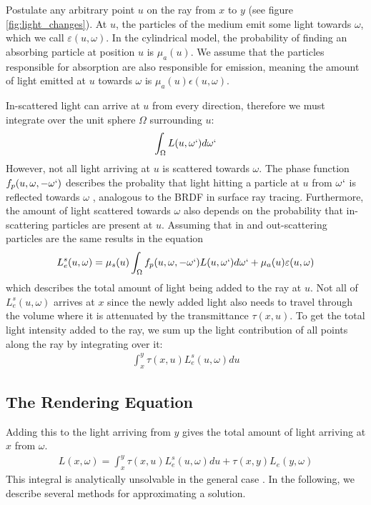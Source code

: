 Postulate any arbitrary point ${u}$ on the ray from ${x}$ to ${y}$ (see figure \ref{fig:light_changes}).
At ${u}$, the particles of the medium emit some light towards $\omega$\cite{468400}, which we call $\varepsilon ({u}, \omega )$. In the cylindrical model, the probability of finding an absorbing particle at position ${u}$ is ${\mu}_a({u})$. We assume that the particles responsible for absorption are also responsible for emission\cite{468400}, meaning the amount of light emitted at ${u}$ towards $\omega$ is ${\mu}_a({u})\epsilon ({u}, \omega )$.

In-scattered light can arrive at ${u}$ from every direction, therefore we must integrate over the unit sphere $\Omega$ surrounding ${u}$\cite{10.1145/280814.280925}:
\begin{align*}
\int_{\Omega} L({u}, \omega `)d\omega `
\end{align*}
However, not all light arriving at ${u}$ is scattered towards $\omega $. The phase function $f_p({u}, \omega , -\omega `)$ describes the probality that light hitting a particle at ${u}$ from $\omega `$ is reflected towards $\omega$ \cite{10.1145/280814.280925, Cerezo2005}, analogous to the BRDF \cite{10.1145/965141.563893} in surface ray tracing. Furthermore, the amount of light scattered towards $\omega $ also depends on the probability that in-scattering particles are present at ${u}$\cite{10.1145/280814.280925}. Assuming that in and out-scattering particles are the same results in the equation
\begin{align*}
L_e^s({u}, \omega ) = {\mu}_s({u})\int_{\Omega} f_p({u}, \omega , -\omega `)L({u}, \omega `)d\omega `  + {\mu}_a({u})\varepsilon ({u}, \omega )
\end{align*}
which describes the total amount of light being added to the ray at ${u}$.
Not all of $L_e^s({u}, \omega )$ arrives at ${x}$ since the newly added light also needs to travel through the volume where it is attenuated by the transmittance $\tau ({x}, {u})$.
To get the total light intensity added to the ray, we sum up the light contribution of all points along the ray by integrating over it\cite{zhou2007real-time}:
\begin{align*}
\int_{{x}}^{{y}} \tau({x}, {u})L_e^s({u}, \omega )d{u}
\end{align*}
\subsection{The Rendering Equation}
Adding this to the light arriving from ${y}$ gives the total amount of light arriving at ${x}$ from $\omega $.
\begin{align*}
L({x}, \omega ) = {\int_{{x}}^{{y}} \tau({x}, {u})L_e^s({u}, \omega )d{u}} + \tau({x}, {y}) L_e({y}, \omega )
\end{align*}
This integral is analytically unsolvable in the general case \cite{10.1145/964965.808594}.
In the following, we describe several methods for approximating a solution.











